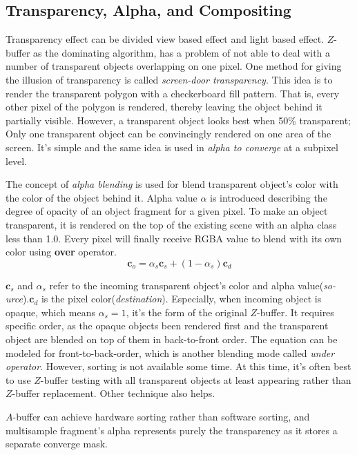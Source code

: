 \documentclass[10pt, a4paper]{article}
\begin{document}
        \subsection{Transparency, Alpha, and Compositing} 
            Transparency effect can be divided view based effect and light based effect. $Z$-buffer as the dominating algorithm, has a problem of not able to deal with a number of transparent objects overlapping on one pixel. One method for giving the illusion of transparency is called \emph{screen-door transparency}. This idea is to render the transparent polygon with a checkerboard fill pattern. That is, every other pixel of the polygon is rendered, thereby leaving the object behind it partially visible. However, a transparent object looks best when 50\% transparent; Only one transparent object can be convincingly rendered on one area of the screen. It's simple and the same idea is used in \emph{alpha to converge} at a subpixel level. 

            The concept of \emph{alpha blending} is used for blend transparent object's color with the color of the object behind it. Alpha value $\alpha$ is introduced describing the degree of opacity of an object fragment for a given pixel. To make an object transparent, it is rendered on the top of the existing scene with an alpha class less than 1.0. Every pixel will finally receive RGBA value to blend with its own color using \textbf{over} operator.
            $$\textbf{c}_o = \alpha_s\textbf{c}_s + (1 - \alpha_s)\textbf{c}_d$$
        
            $\textbf{c}_s$ and $\alpha_s$ refer to the incoming transparent object's color and alpha value(\emph{so-}\newline \noindent\emph{urce}).$\textbf{c}_d$ is the pixel color(\emph{destination}). Especially, when incoming object is opaque, which means $\alpha_s = 1$, it's the form of the original $Z$-buffer. It requires specific order, as the opaque objects been rendered first and the transparent object are blended on top of them in back-to-front order. The equation can be modeled for front-to-back-order, which is another blending mode called \emph{under operator}. However, sorting is not available some time. At this time, it's often best to use $Z$-buffer testing with all transparent objects at least appearing rather than $Z$-buffer replacement. Other technique also helps. 

            $A$-buffer can achieve hardware sorting rather than software sorting, and multisample fragment's alpha represents purely the transparency as it stores a separate converge mask. 
\end{document}
